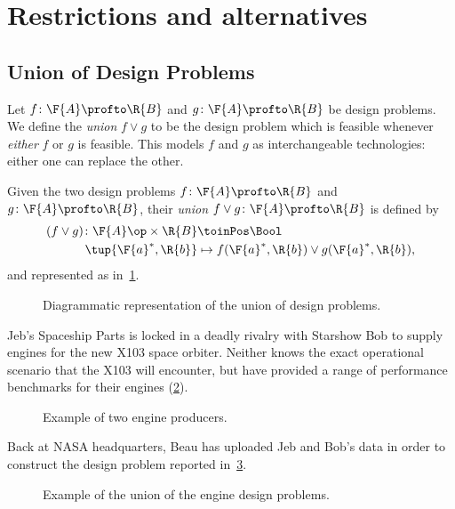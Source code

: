 
\section{Restrictions and alternatives}

\subsection{Union of Design Problems}
Let $f\colon \F{A}\profto \R{B}$ and $g\colon \F{A}\profto \R{B}$ be design problems. We define the \emph{union} $f \vee g$ to be the design problem which is feasible whenever \emph{either} $f$ or $g$ is feasible.
This models $f$ and $g$ as interchangeable technologies: either one can replace the other.

\begin{definition}
  Given the two design problems $f \colon \F{A} \profto \R{B}$ and $g \colon \F{A} \profto \R{B}$, their \emph{union} $f \vee g \colon \F{A} \profto \R{B}$ is defined by
  \begin{equation}
    \begin{aligned}
      (f \vee g)\colon \F{A}\op \times \R{B} & \toinPos \Bool \\
      \tup{\F{a}^*, \R{b}} & \mapsto f(\F{a}^*, \R{b}) \vee g(\F{a}^*, \R{b}),
    \end{aligned}
  \end{equation}
  and represented as in~\cref{fig:uniondp}.
\end{definition}

\begin{figure}[h!]
  \begin{center}
  \end{center}
  \caption{Diagrammatic representation of the union of design problems. \label{fig:uniondp}}
\end{figure}

\begin{example}
  Jeb's Spaceship Parts is locked in a deadly rivalry with Starshow Bob to supply engines for the new X103 space orbiter. Neither knows the exact operational scenario that the X103 will encounter, but have provided a range of performance benchmarks for their engines (\cref{fig:exunion_1}).
  \begin{figure}[h!]
    \begin{center}
    \end{center}
    \caption{Example of two engine producers. \label{fig:exunion_1}}
  \end{figure}
  Back at NASA headquarters, Beau has uploaded Jeb and Bob's data in order to construct the design problem reported in~\cref{fig:exunion_2}.
  \begin{figure}[h!]
    \begin{center}
    \end{center}
    \caption{Example of the union of the engine design problems. \label{fig:exunion_2}}
  \end{figure}
\end{example}

